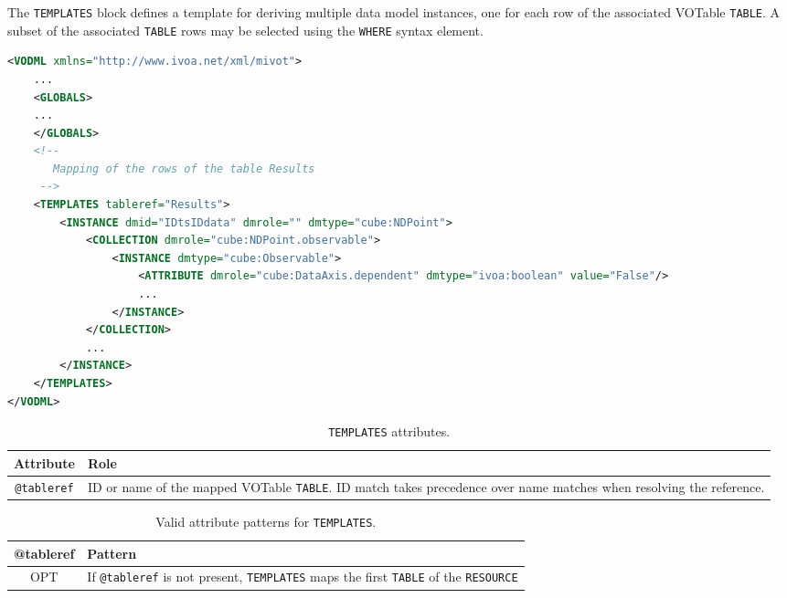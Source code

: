The \texttt{TEMPLATES} block defines a template for deriving multiple data model instances,
one for each row of the associated VOTable \texttt{TABLE}.  A subset of the associated
\texttt{TABLE} rows may be selected using the \texttt{WHERE} syntax element.

\begin{lstlisting}[caption={Example of a \texttt{TEMPLATES} block mapping the rows of the table \texttt{Results} (see line~\ref{TEMPLATES_snippet} in Appendix~\ref{appendix_A}).
Each row of the table named \texttt{Results} is be mapped on an instance of the VO-DML type \texttt{cube:NDPoint}.
Instances mapping a table row do not play any particular role.},language=XML]
<VODML xmlns="http://www.ivoa.net/xml/mivot">
    ...
    <GLOBALS>
    ...
    </GLOBALS>
    <!--
       Mapping of the rows of the table Results
     -->  
    <TEMPLATES tableref="Results">
        <INSTANCE dmid="IDtsIDdata" dmrole="" dmtype="cube:NDPoint">
            <COLLECTION dmrole="cube:NDPoint.observable">
                <INSTANCE dmtype="cube:Observable">
                    <ATTRIBUTE dmrole="cube:DataAxis.dependent" dmtype="ivoa:boolean" value="False"/>
                    ...
                </INSTANCE>
            </COLLECTION>
            ...
        </INSTANCE>
    </TEMPLATES>
</VODML>
\end{lstlisting}

\begin{table}[!htbp]
  \small
  \centering
  \begin{tabulary}{\linewidth}{|c|J|}
    \hline 
         \textbf{Attribute} & 
         \textbf {Role}\\
    \hline
    \hline  
         \texttt{@tableref} & 
         ID or name of the mapped VOTable \texttt{TABLE}. ID match takes precedence over name matches when resolving the reference. \\
    \hline 
  \end{tabulary}
  \caption{\texttt{TEMPLATES} attributes.} 
  \label{tbl:templates-att}
\end{table}

\begin{table}[!htbp]
  \small
  \centering
  \begin{tabulary}{\linewidth}{|c|J|}
    \hline 
        \textbf{@tableref} &
        \textbf{Pattern}\\
    \hline
    \hline  
        OPT &           
        If \texttt{@tableref} is not present, \texttt{TEMPLATES} maps the first \texttt{TABLE} of the \texttt{RESOURCE}\\
    \hline 
  \end{tabulary}
  \caption{Valid attribute patterns for  \texttt{TEMPLATES}.} 
  \label{tbl:templates-pattern}
 \end{table}

